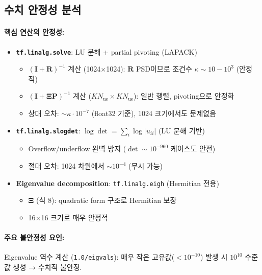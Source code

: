 \documentclass[10pt]{article}
\begin{document}
\newpage

\subsection{수치 안정성 분석}

\paragraph{핵심 연산의 안정성:}

\begin{itemize}
\item \textbf{\texttt{tf.linalg.solve}}: LU 분해 + partial pivoting (LAPACK)
\begin{itemize}
  \item $(\mathbf{I}+\mathbf{R})^{-1}$ 계산 (1024$\times$1024): $\mathbf{R}$ PSD이므로 조건수 $\kappa \sim 10-10^3$ (안정적)
  \item $(\mathbf{I}+\boldsymbol{\Xi}\mathbf{P})^{-1}$ 계산 ($K N_{\text{ue}} \times K N_{\text{ue}}$): 일반 행렬, pivoting으로 안정화
  \item 상대 오차: $\sim \kappa \cdot 10^{-7}$ (float32 기준), 1024 크기에서도 문제없음
\end{itemize}

\item \textbf{\texttt{tf.linalg.slogdet}}: $\log\det = \sum_i \log|u_{ii}|$ (LU 분해 기반)
\begin{itemize}
  \item Overflow/underflow 완벽 방지 ($\det \sim 10^{-960}$ 케이스도 안전)
  \item 절대 오차: 1024 차원에서 $\sim 10^{-4}$ (무시 가능)
\end{itemize}

\item \textbf{Eigenvalue decomposition}: \texttt{tf.linalg.eigh} (Hermitian 전용)
\begin{itemize}
  \item $\boldsymbol{\Xi}$ (식 8): quadratic form 구조로 Hermitian 보장
  \item 16$\times$16 크기로 매우 안정적
\end{itemize}
\end{itemize}

\paragraph{주요 불안정성 요인:}
Eigenvalue 역수 계산 (\texttt{1.0/eigvals}): 매우 작은 고유값($< 10^{-10}$) 발생 시 $10^{10}$ 수준 값 생성 → 수치적 불안정.
\end{document}
